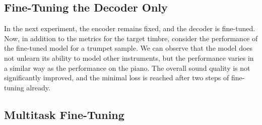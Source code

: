 \subsection{Fine-Tuning the Decoder Only}
\label{decoder-only}
In the next experiment, the encoder remains fixed, and the decoder is fine-tuned. Now, in addition to the metrics for the target timbre, consider the performance of the fine-tuned model for a trumpet sample. 
We can observe that the model does not unlearn its ability to model other instruments, but the performance varies in a similar way as the performance on the piano. \newline
The overall sound quality is not significantly improved, and the minimal loss is reached after two steps of fine-tuning already.

\subsection{Multitask Fine-Tuning}
\label{fine-tune-multitask}

